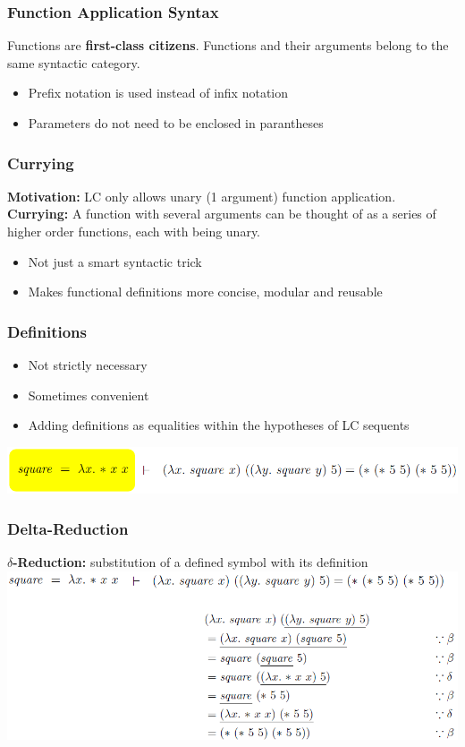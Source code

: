 \subsubsection{Function Application Syntax}
Functions are \textbf{first-class citizens}. Functions and their arguments belong to the same syntactic category.
\begin{itemize}
    \item Prefix notation is used instead of infix notation
    \item Parameters do not need to be enclosed in parantheses
\end{itemize}

\subsubsection{Currying}
\textbf{Motivation:} LC only allows unary (1 argument) function application.\\ 
\textbf{Currying:} A function with several arguments can be thought of as a series of higher order functions, each with being unary.
\begin{itemize}
    \item Not just a smart syntactic trick
    \item Makes functional definitions more concise, modular and reusable
\end{itemize}

\subsubsection{Definitions}
\begin{itemize}
    \item Not strictly necessary 
    \item Sometimes convenient
    \item Adding definitions as equalities within the hypotheses of LC sequents
\end{itemize}
\includegraphics[width=\linewidth]{img/lc_definitions.png}

\subsubsection{Delta-Reduction}
\textbf{$\delta$-Reduction:} substitution of a defined symbol with its definition\\
\includegraphics[width=\linewidth]{img/lc_delta.png}

